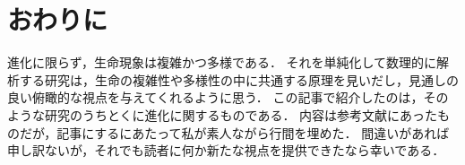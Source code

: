 \section{おわりに}
進化に限らず，生命現象は複雑かつ多様である．
それを単純化して数理的に解析する研究は，生命の複雑性や多様性の中に共通する原理を見いだし，見通しの良い俯瞰的な視点を与えてくれるように思う．
この記事で紹介したのは，そのような研究のうちとくに進化に関するものである．
内容は参考文献にあったものだが，記事にするにあたって私が素人ながら行間を埋めた．
間違いがあれば申し訳ないが，それでも読者に何か新たな視点を提供できたなら幸いである．